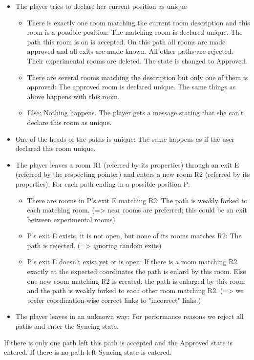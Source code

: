 \documentclass[11pt]{article}
\begin{document}
\begin{itemize}
\item{The player tries to declare her current position as unique}
\begin{itemize}
\item{There is exactly one room matching the current room description and this room is a
possible position:}
The matching room is declared unique. The path this room is on is accepted. On this path all rooms
are made approved and all exits are made known. All other paths are rejected. Their experimental
rooms are deleted. The state is changed to Approved.
\item{There are several rooms matching the description but only one of them is approved:} The
approved room is declared unique. The same things as above happens with this room.
\item{Else:} Nothing happens. The player gets a message stating that she can't declare this room as
unique.
\end{itemize}
\item{One of the heads of the paths is unique:} The same happens as if the user declared this
room unique.
\item{The player leaves a room R1 (referred by its properties) through an exit E (referred by the
respecting pointer) and enters a new room R2 (referred by its properties):} For each path ending in a
possible position P:
\begin{itemize}
\item{There are rooms in P's exit E matching R2:} The path is weakly forked to each
matching room. (=> near rooms are preferred; this could be an exit between experimental rooms)
\item{P's exit E exists, it is not open, but none of its rooms matches R2:} The path is rejected. (=>
ignoring random exits)
\item{P's exit E doesn't exist yet or is open:} If there is a room matching R2 exactly at the
expected coordinates the path is enlard by this room. Else one new room matching R2 is created, the
path is enlarged by this room and the path is weakly forked to each other room matching R2. (=> we
prefer coordination-wise correct links to "incorrect" links.)
\end{itemize}


\item{The player leaves in an unknown way:} For performance reasons we reject all paths and enter
the Syncing state.
\end{itemize}
If there is only one path left this path is accepted and the Approved state is entered. If there
is no path left Syncing state is entered.
\end{document}

